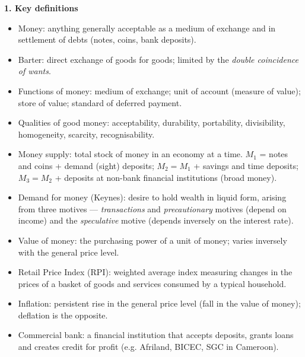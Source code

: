 \documentclass[11pt]{article}
\newcommand{\cle}[1]{{\popxbold\color{popdark}#1}}
\begin{document}
\begin{bilan}
\textbf{1. Key definitions}\par
\begin{itemize}
\item \cle{Money}: anything generally acceptable as a medium of exchange and in settlement of debts (notes, coins, bank deposits).
\item \cle{Barter}: direct exchange of goods for goods; limited by the \emph{double coincidence of wants}.
\item \cle{Functions of money}: medium of exchange; unit of account (measure of value); store of value; standard of deferred payment.
\item \cle{Qualities of good money}: acceptability, durability, portability, divisibility, homogeneity, scarcity, recognisability.
\item \cle{Money supply}: total stock of money in an economy at a time. $M_1$ = notes and coins + demand (sight) deposits; $M_2 = M_1$ + savings and time deposits; $M_3 = M_2$ + deposits at non-bank financial institutions (broad money).
\item \cle{Demand for money} (Keynes): desire to hold wealth in liquid form, arising from three motives --- \emph{transactions} and \emph{precautionary} motives (depend on income) and the \emph{speculative} motive (depends inversely on the interest rate).
\item \cle{Value of money}: the purchasing power of a unit of money; varies inversely with the general price level.
\item \cle{Retail Price Index (RPI)}: weighted average index measuring changes in the prices of a basket of goods and services consumed by a typical household.
\item \cle{Inflation}: persistent rise in the general price level (fall in the value of money); \cle{deflation} is the opposite.
\item \cle{Commercial bank}: a financial institution that accepts deposits, grants loans and creates credit for profit (e.g. Afriland, BICEC, SGC in Cameroon).
\end{itemize}


\end{bilan}
\end{document}
